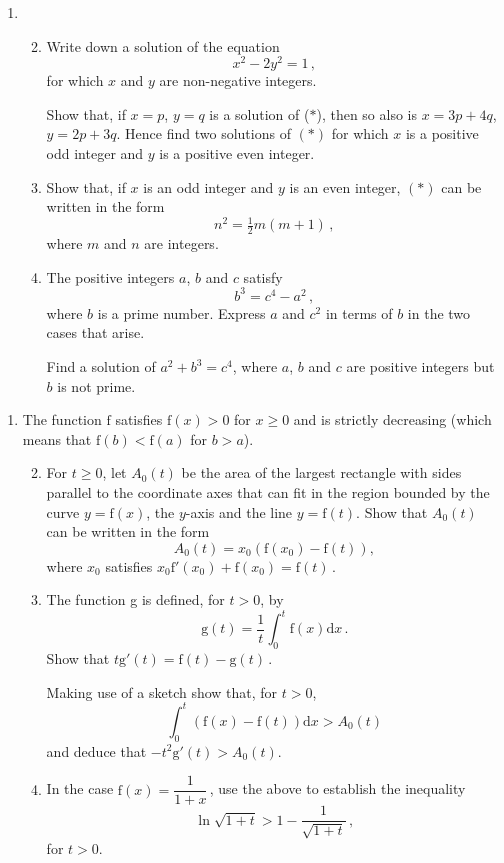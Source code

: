 \documentclass[a4, 11pt]{report}
\newlength{\qspace}
\newcounter{qnumber}
\newenvironment{question}%
 {\vspace{\qspace}
  \begin{enumerate}[\bfseries 1\quad][10]%
    \setcounter{enumi}{\value{qnumber}}%
    \item%
 }
{
  \end{enumerate}
  \filbreak
  \stepcounter{qnumber}
 }
\newenvironment{questionparts}[1][1]%
 {
  \begin{enumerate}[\bfseries (i)]%
    \setcounter{enumii}{#1}
    \addtocounter{enumii}{-1}
    \setlength{\itemsep}{5mm}
    \setlength{\parskip}{8pt}
 }
 {
  \end{enumerate}
 }
\def\d{{\mathrm d}}
\def\g{{\mathrm g}}
\def\f{{\mathrm f}}
\def\ge{\geqslant}
\begin{document}
\begin{question}
\begin{questionparts}
\item
Write down a solution of the equation
\[
x^2-2y^2 =1\,,
\tag{$*$}
\]
for which $x$ and $y$ are non-negative integers.

Show that, if  $x=p$, $y=q$ is a solution of ($*$),
then so also is $x=3p+4q$, $y=2p+3q$. Hence find two   
solutions of $(*)$ for which $x$ is a positive odd integer and $y$ is a 
positive even integer.
\item Show that, if $x$ is an odd integer and $y$ is an 
even integer, $(*)$ can be written in the form
\[
n^2 = \tfrac12 m(m+1)\,,
\]
where $m$ and $n$ are integers.


\item
The positive integers $a$, $b$ and $c$ satisfy
\[
b^3=c^4-a^2\,,
\]
where $b$ is a prime number. Express $a$ and $c^2$ in terms of $b$ in the 
two cases that arise.

Find a solution of $a^2+b^3=c^4$, where $a$, $b$ and $c$ are positive 
integers but  $b$ is not prime.
\end{questionparts}
\end{question}
\vspace{-0.9cm}	
\begin{question}
The function $\f$ satisfies  $\f(x)>0$ for $x\ge0$ and  is strictly
decreasing (which means that 
$\f(b)<\f(a)$
for $b>a$).     
   
\begin{questionparts}
\item

For $t\ge0$, let  $A_0(t)$ be the area of the largest rectangle 
with sides parallel to the coordinate axes that can fit in the region
bounded by the curve $y=\f(x)$, 
the $y$-axis 
and the line $y=\f(t)$. Show that $A_0(t)$ 
can be written in the form
\[
A_0(t) =x_0\left( \f(x_0) -\f(t)\right),
\]
where $x_0$ satisfies $x_0 \f'(x_0) +\f(x_0) = \f(t)\,$. 

\item The function g is defined,
for $t>  0$,  by
\[
\g(t) =\frac 1t \int_0^t \f(x) \d x\,.
\]
Show that $t \g'(t) = \f(t) -\g(t)\,$.

Making use of a sketch show that, for $t>0$, 
\[
 \int_0^t \left( \f(x) - \f(t)\right) \d x > 
A_0(t)
\]
and deduce that $-t^2 \g'(t)> A_0(t)$.

\item In the case $\f(x)= \dfrac 1 {1+x}\,$, use the above to establish the inequality
\[
\ln \sqrt{1+t} > 1 - \frac 1 {\sqrt{1+t}}
\,,
\]
for $t>0$.
 
\end{questionparts}
\end{question}	
		
\end{document}
